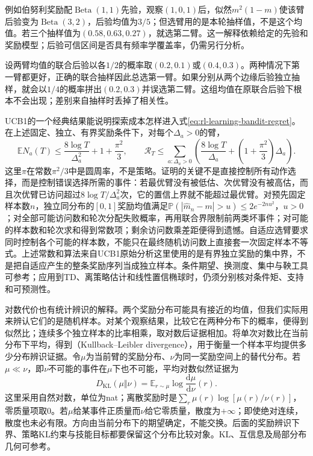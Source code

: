 例如伯努利奖励配$\operatorname{Beta}(1,1)$先验，观察$(1,0,1)$后，似然$m^2(1-m)$使该臂后验变为$\operatorname{Beta}(3,2)$，后验均值为$3/5$；但选臂用的是本轮抽样值，不是这个均值。若三个抽样值为$(0.58,0.63,0.27)$，就选第二臂。这一解释依赖给定的先验和奖励模型；后验可信区间是否具有频率学覆盖率，仍需另行分析。

\begin{example}[独立抽取边缘后验会改变选臂概率]
  \label{ex:rl-learning-thompson-joint}
  设两臂均值的联合后验以各$1/2$的概率取$(0.2,0.1)$或$(0.4,0.3)$。两种情况下第一臂都更好，正确的联合抽样因此总选第一臂。如果分别从两个边缘后验独立抽样，就会以$1/4$的概率拼出$(0.2,0.3)$并误选第二臂。这组均值在原联合后验下根本不会出现；差别来自抽样时丢掉了相关性。
\end{example}

UCB1的一个经典结果能说明探索成本怎样进入式\eqref{eq:rl-learning-bandit-regret}。在上述固定、独立、有界奖励条件下，对每个$\Delta_a>0$的臂，
\begin{equation}
  \mathbb E N_a(T)
  \leq \frac{8\log T}{\Delta_a^2}+1+\frac{\pi^2}{3},
  \qquad
  \mathcal R_T
  \leq\sum_{a:\Delta_a>0}
    \left(\frac{8\log T}{\Delta_a}
    +\left(1+\frac{\pi^2}{3}\right)\Delta_a\right).
  \label{eq:rl-learning-ucb-bound}
\end{equation}
这里$\pi$在常数$\pi^2/3$中是圆周率，不是策略。证明的关键不是直接控制所有动作选择，而是控制错误选择所需的事件：若最优臂没有被低估、次优臂没有被高估，而且次优臂已访问超过$8\log T/\Delta_a^2$次，它的置信上界就不能超过最优臂。对预先固定样本数$n$，独立同分布的$[0,1]$奖励均值满足$\mathbb P(|\widehat m_n-m|>u)\leq2e^{-2nu^2}$，$u>0$；对全部可能访问数和轮次分配失败概率，再用联合界限制前两类坏事件；对可能的样本数和轮次求和得到常数项；剩余访问数乘差距便得到遗憾。自适应选臂要求同时控制各个可能的样本数，不能只在最终随机访问数上直接套一次固定样本不等式。上述常数和算法来自UCB1原始分析这里使用的是有界独立奖励的集中界，不是把自适应产生的整条奖励序列当成独立样本。条件期望、换测度、集中与鞅工具可参考；应用到TD、离策略估计和线性置信椭球时，仍须分别核对条件矩、支持和可预测性。

对数代价也有统计辨识的解释。两个奖励分布可能具有接近的均值，但我们实际用来辨认它们的是随机样本。对某个观察结果，比较它在两种分布下的概率，便得到似然比；连续多个独立样本的比率相乘，取对数后证据相加。将单次对数比在当前分布下平均，得到（Kullback--Leibler divergence），用于衡量一个样本平均提供多少分布辨识证据。令$\mu$为当前臂的奖励分布、$\nu$为同一奖励空间上的替代分布。若$\mu\ll\nu$，即$\nu$不可能的事件在$\mu$下也不可能，平均对数似然证据为
\[
 D_{\mathrm{KL}}(\mu\Vert\nu)
   =\mathbb E_{r\sim\mu}\log\frac{\mathrm d\mu}{\mathrm d\nu}(r).
\]
这里采用自然对数，单位为nat；离散奖励时是$\sum_r\mu(r)\log[\mu(r)/\nu(r)]$，零质量项取0。若$\mu$给某事件正质量而$\nu$给它零质量，散度为$+\infty$；即使绝对连续，散度也未必有限。方向由当前分布下的期望确定，不能交换。后面的奖励辨识下界、策略KL约束与技能目标都要保留这个分布比较对象。KL、互信息及局部分布几何可参考。

